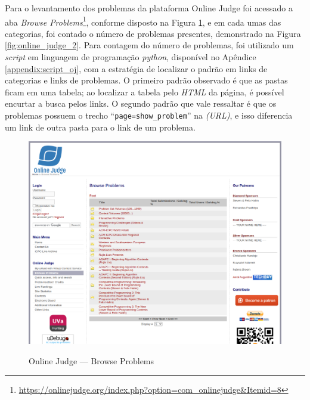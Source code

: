 Para o levantamento dos problemas da plataforma Online Judge foi acessado a aba \textit{Browse Problems}\footnote{\url{https://onlinejudge.org/index.php?option=com\_onlinejudge\&Itemid=8}}, conforme disposto na Figura \ref{fig:online_judge_1}, e em cada umas das categorias, foi contado o número de problemas presentes, demonstrado na Figura \ref{fig:online_judge_2}. Para contagem do número de problemas, foi utilizado um \textit{script} em linguagem de programação \textit{python}, disponível no Apêndice \ref{appendix:script_oj}, com a estratégia de localizar o padrão em links de categorias e links de problemas. O primeiro padrão observado é que as pastas ficam em uma tabela; ao localizar a tabela pelo \textit{HTML} da página, é possível encurtar a busca pelos links. O segundo padrão que vale ressaltar é que os problemas possuem o trecho ``\texttt{page=show\_problem}'' na \textit{(URL)}, e isso diferencia um link de outra pasta para o link de um problema.

\begin{figure}[H]
    \centering
    \caption{Online Judge — Browse Problems}
    \includegraphics[keepaspectratio=true,scale=0.32]{figuras/online_judge_1.eps}
    \label{fig:online_judge_1}
\end{figure}

